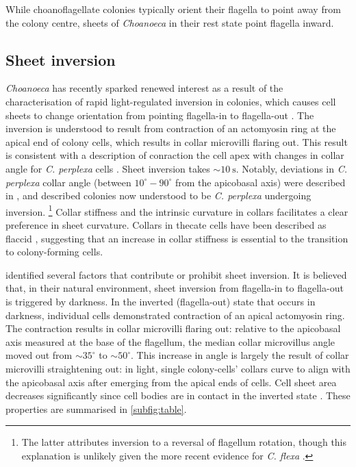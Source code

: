 While choanoflagellate colonies typically orient their flagella to point away from the colony centre, sheets of \textit{Choanoeca} in their rest state point flagella inward. 

\subsection{Sheet inversion}

\textit{Choanoeca} has recently sparked renewed interest as a result of the characterisation of rapid light-regulated inversion in colonies, which causes cell sheets to change orientation from pointing flagella-in to flagella-out \citep{brunet2019}.
The inversion is understood to result from contraction of an actomyosin ring at the apical end of colony cells, which results in collar microvilli flaring out. 
This result is consistent with a description of conraction the cell apex with changes in collar angle for \textit{C. perplexa} cells \citep{leadbeater1977}.
Sheet inversion takes $\sim\SI{10}{\second}$.
Notably, deviations in \textit{C. perplexa} collar angle (between $10^\circ-90^\circ$ from the apicobasal axis) were described in \citet{ellis1930}, and \citet{leadbeater1983} described colonies now understood to be \textit{C. perplexa} undergoing inversion. 
\footnote{The latter attributes inversion to a reversal of flagellum rotation, though this explanation is unlikely given the more recent evidence for \textit{C. flexa} \citep{brunet2019}.}
Collar stiffness and the intrinsic curvature in collars facilitates a clear preference in sheet curvature. 
Collars in thecate cells have been described as flaccid \citep{leadbeater1977}, suggesting that an increase in collar stiffness is essential to the transition to colony-forming cells. 

\citet{brunet2019} identified several factors that contribute or prohibit sheet inversion. 
It is believed that, in their natural environment, sheet inversion from flagella-in to flagella-out is triggered by darkness. 
In the inverted (flagella-out) state that occurs in darkness, individual cells demonstrated contraction of an apical actomyosin ring.
The contraction results in collar microvilli flaring out: relative to the apicobasal axis measured at the base of the flagellum, the median collar microvillus angle moved out from $\sim35^\circ$ to $\sim50^\circ$.
This increase in angle is largely the result of collar microvilli straightening out: in light, single colony-cells' collars curve to align with the apicobasal axis after emerging from the apical ends of cells.
Cell sheet area decreases significantly since cell bodies are in contact in the inverted state \citep{thibaut}.
These properties are summarised in \cref{subfig:table}.

